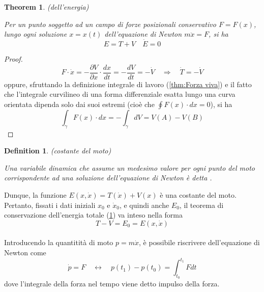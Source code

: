 \documentclass{article}
\newtheorem{theorem}{Theorem}[section]
\newtheorem{definition}{Definition}[section]
\begin{document}
            \begin{theorem}(dell'energia)
                \label{thm:Conservazione dell'energia}

                Per un punto soggetto ad un campo di forze posizionali conservativo $F = F(x)$, lungo ogni soluzione $x = x(t)$ dell'equazione di Newton $m \ddot{x} = F$, 
                si ha \[ E = T + V \quad \dot{E} = 0 \]
                
            \end{theorem}
            \begin{proof}

                \[ F \cdot \dot{x} = - \frac{\partial V}{\partial x} \cdot \frac{dx}{dt} = - \frac{dV}{dt} = - \dot{V} \quad \Longrightarrow \quad \dot{T} = -\dot{V} \]
                oppure, sfruttando la definizione integrale di lavoro (\ref{thm:Forza viva}) e il fatto che l'integrale curvilineo di una forma differenziale esatta
                lungo una curva orientata dipenda solo dai suoi estremi (cioè che $\oint F(x) \cdot dx = 0$), si ha
                \[ \int_{\gamma}F(x) \cdot dx = - \int_{\gamma} dV = V(A) - V(B) \]

            \end{proof}
            
            \begin{definition}(costante del moto)
                \label{def:costante del moto}

                Una variabile dinamica che assume un medesimo valore per ogni punto del moto corrispondente ad una soluzione dell'equazione di Newton è detta .
            
            \end{definition}
            Dunque, la funzione $E(x, \dot{x}) = T(\dot{x}) + V(x)$ è una costante del moto. Pertanto, fissati i dati iniziali $x_0$ e $\dot{x}_0$, e quindi anche $E_0$,
            il teorema di conservazione dell'energia totale (\ref{thm:Conservazione dell'energia}) va inteso nella forma \[ T - V = E_0 = E(x, \dot{x})\] \\
            Introducendo la quantitità di moto $p = m \dot{x}$, è possibile riscrivere dell'equazione di Newton come 
            \[ \dot{p} = F \quad \longleftrightarrow \quad p(t_1) - p(t_0) = \int_{t_0}^{t_1} F dt \] dove l'integrale della forza nel tempo viene detto impulso della forza. 
\end{document}
